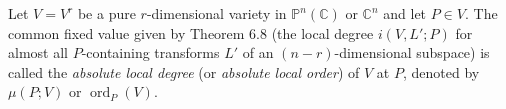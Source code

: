 Let $V = V^r$ be a pure $r$-dimensional variety in $\mathbb{P}^n(\mathbb{C})$ or $\mathbb{C}^n$ and let $P \in V$. The common fixed value given by Theorem 6.8 (the local degree $i(V, L'; P)$ for almost all $P$-containing transforms $L'$ of an $(n-r)$-dimensional subspace) is called the \textit{absolute local degree} (or \textit{absolute local order}) of $V$ at $P$, denoted by $\mu(P; V)$ or $\operatorname{ord}_P(V)$.
